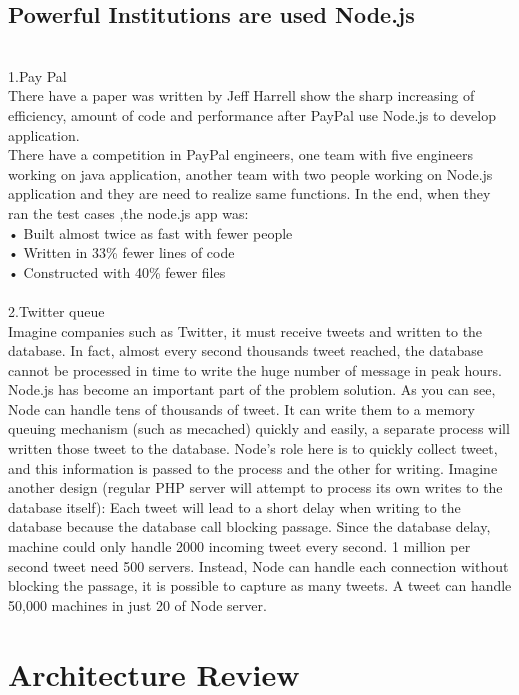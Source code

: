 \subsection{Powerful Institutions are used Node.js}
\\	
1.Pay Pal \cite{5}\\
There have a paper was written by Jeff Harrell show the sharp increasing of efficiency, amount of code and performance after PayPal use Node.js to develop application.\\
There have a competition in PayPal engineers, one team with five engineers working on java application, another team with two people working on Node.js application and they are need to realize same functions. In the end, when they ran the test cases ,the node.js app was:\\
•	Built almost twice as fast with fewer people\\
•	Written in 33\% fewer lines of code\\
•	Constructed with 40\% fewer files\\
\\
2.Twitter queue\\
Imagine companies such as Twitter, it must receive tweets and written to the database. In fact, almost every second thousands tweet reached, the database cannot be processed in time to write the huge number of message in peak hours. Node.js has become an important part of the problem solution. As you can see, Node can handle tens of thousands of tweet. It can write them to a memory queuing mechanism (such as mecached) quickly and easily, a separate process will written those tweet to the database. Node's role here is to quickly collect tweet, and this information is passed to the process and the other for writing. Imagine another design (regular PHP server will attempt to process its own writes to the database itself): Each tweet will lead to a short delay when writing to the database because the database call blocking passage. Since the database delay, machine could only handle 2000 incoming tweet every second. 1 million per second tweet need 500 servers. Instead, Node can handle each connection without blocking the passage, it is possible to capture as many tweets. A tweet can handle 50,000 machines in just 20 of Node server.
\\
\section{Architecture Review} 
